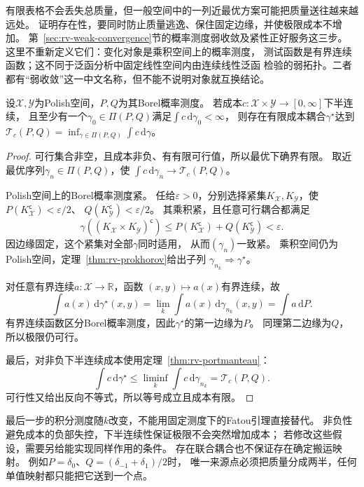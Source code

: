 有限表格不会丢失总质量，但一般空间中的一列近最优方案可能把质量送往越来越远处。
证明存在性，要同时防止质量逃逸、保住固定边缘，并使极限成本不增加。
第~\ref{sec:rv-weak-convergence}节的概率测度弱收敛及紧性正好服务这三步。
这里不重新定义它们：变化对象是乘积空间上的概率测度，
测试函数是有界连续函数；这不同于泛函分析中固定线性空间内由连续线性泛函
检验的弱拓扑。二者都有“弱收敛”这一中文名称，但不能不说明对象就互换结论。

\begin{theorem}[最优耦合存在]
\label{thm:information-optimal-coupling-existence}
设\(\mathcal X,\mathcal Y\)为Polish空间，\(P,Q\)为其Borel概率测度。
若成本\(c:\mathcal X\times\mathcal Y\to[0,\infty]\)下半连续，
且至少有一个\(\gamma_0\in\Pi(P,Q)\)满足\(\int c\,\mathrm d\gamma_0<\infty\)，
则存在有限成本耦合\(\gamma^\star\)达到
\(\mathcal T_c(P,Q)=\inf_{\gamma\in\Pi(P,Q)}\int c\,\mathrm d\gamma\)。
\end{theorem}
\begin{proof}
可行集合非空，且成本非负、有有限可行值，所以最优下确界有限。
取近最优序列\(\gamma_n\in\Pi(P,Q)\)，使
\(\int c\,\mathrm d\gamma_n\to\mathcal T_c(P,Q)\)。

Polish空间上的Borel概率测度紧。
任给\(\varepsilon>0\)，分别选择紧集\(K_{\mathcal X},K_{\mathcal Y}\)，使
\(P(K_{\mathcal X}^{\mathsf c})<\varepsilon/2\)、
\(Q(K_{\mathcal Y}^{\mathsf c})<\varepsilon/2\)。
其乘积紧，且任意可行耦合都满足
\[
  \gamma((K_{\mathcal X}\times K_{\mathcal Y})^{\mathsf c})
  \leq P(K_{\mathcal X}^{\mathsf c})+Q(K_{\mathcal Y}^{\mathsf c})
  <\varepsilon.
\]
因边缘固定，这个紧集对全部\(\gamma\)同时适用，
从而\((\gamma_n)\)一致紧。
乘积空间仍为Polish空间，定理~\ref{thm:rv-prokhorov}给出子列
\(\gamma_{n_k}\Rightarrow\gamma^\star\)。

对任意有界连续\(a:\mathcal X\to\mathbb R\)，函数
\((x,y)\mapsto a(x)\)有界连续，故
\[
  \int a(x)\,\mathrm d\gamma^\star(x,y)
  =\lim_k\int a(x)\,\mathrm d\gamma_{n_k}(x,y)=\int a\,\mathrm dP.
\]
有界连续函数区分Borel概率测度，因此\(\gamma^\star\)的第一边缘为\(P\)。
同理第二边缘为\(Q\)，所以极限仍可行。

最后，对非负下半连续成本使用定理~\ref{thm:rv-portmanteau}：
\[
  \int c\,\mathrm d\gamma^\star
  \leq\liminf_k\int c\,\mathrm d\gamma_{n_k}
  =\mathcal T_c(P,Q).
\]
可行性又给出反向不等式，所以等号成立且成本有限。
\end{proof}

最后一步的积分测度随\(k\)改变，不能用固定测度下的Fatou引理直接替代。
非负性避免成本的负部失控，下半连续性保证极限不会突然增加成本；
若修改这些假设，需要另给能实现同样作用的条件。
存在联合耦合也不保证存在确定搬运映射。
例如\(P=\delta_0\)、\(Q=(\delta_{-1}+\delta_1)/2\)时，
唯一来源点必须把质量分成两半，任何单值映射都只能把它送到一个点。

